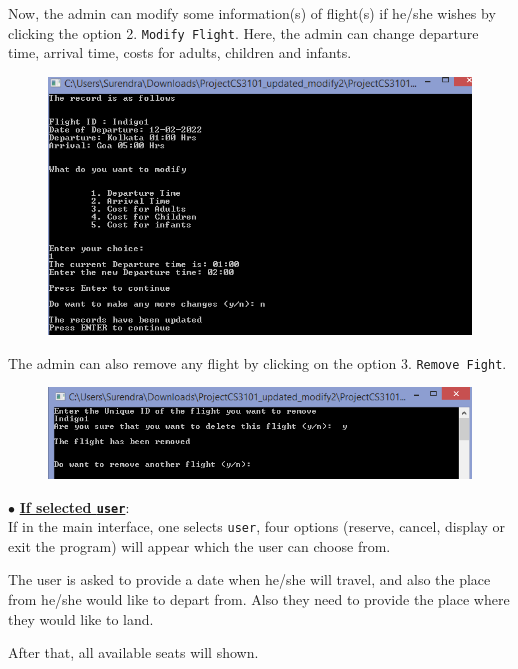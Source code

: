 \documentclass[12pt]{article}
\begin{document}
Now, the admin can modify some information(s) of flight(s) if he/she wishes by clicking the option 2. \texttt{Modify Flight}. Here, the admin can change departure time, arrival time, costs for adults, children and infants.

\begin{figure}[!h]
\centering
\includegraphics[scale=0.75]{modify1}
\end{figure} 

The admin can also remove any flight by clicking on the option 3. \texttt{Remove Fight}.

\begin{figure}[!h]
\centering
\includegraphics[scale=0.75]{remove}
\end{figure} 


$\bullet$ \underline{\textbf{If selected \texttt{user}}}:\\

If in the main interface, one selects \texttt{user}, four options (reserve, cancel, display or exit the program) will appear which the user can choose from.

The user is asked to provide a date when he/she will travel, and also the place from he/she would like to depart from. Also they need to provide the place where they would like to land.

After that, all available seats will shown. 
\end{document}
